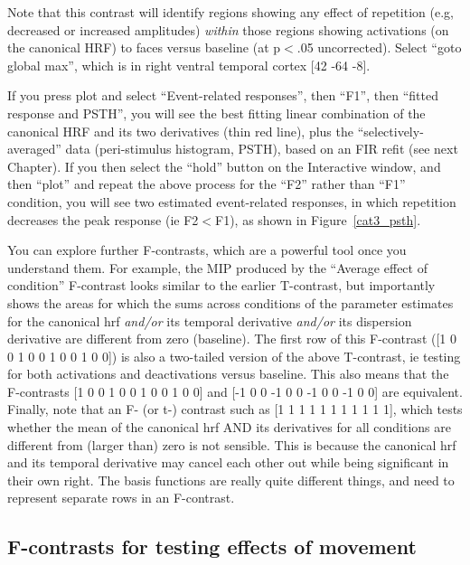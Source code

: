 Note that this contrast will identify regions showing any effect of repetition (e.g, decreased or increased amplitudes) \emph{within} those regions showing activations (on the canonical HRF) to faces versus baseline (at p$<$.05 uncorrected). Select ``goto global max'', which is in right ventral temporal cortex [42 -64 -8].

If you press plot and select ``Event-related responses'', then ``F1'', then ``fitted response and PSTH'', you will see the best fitting linear combination of the canonical HRF and its two derivatives (thin red line), plus the ``selectively-averaged'' data (peri-stimulus histogram, PSTH), based on an FIR refit (see next Chapter). 
If you then select the ``hold'' button on the Interactive window, and then ``plot'' and repeat the above process for the ``F2'' rather than ``F1'' condition, you will see two estimated event-related responses, in which repetition decreases the peak response (ie F2$<$F1), as shown in Figure~\ref{cat3_psth}.

You can explore further F-contrasts, which are a powerful tool once you understand them. For example, the MIP produced by the ``Average effect of condition'' F-contrast looks similar to the earlier T-contrast, but importantly shows the areas for which the sums across conditions of the parameter estimates for the canonical hrf \emph{and/or} its temporal derivative \emph{and/or} its dispersion derivative are different from zero (baseline). The first row of this F-contrast ([1 0 0 1 0 0 1 0 0 1 0 0]) is also a two-tailed version of the above T-contrast, ie testing for both activations and deactivations versus baseline. This also means that the F-contrasts [1 0 0 1 0 0 1 0 0 1 0 0] and [-1 0 0 -1 0 0 -1 0 0 -1 0 0] are equivalent. Finally, note that an F- (or t-) contrast such as [1 1 1 1 1 1 1 1 1 1 1], which tests whether the mean of the canonical hrf AND its derivatives for all conditions are different from (larger than) zero is not sensible. This is because the canonical hrf and its temporal derivative may cancel each other out while being significant in their own right. The basis functions are really quite different things, and need to represent separate rows in an F-contrast. 

\subsection{F-contrasts for testing effects of movement}


